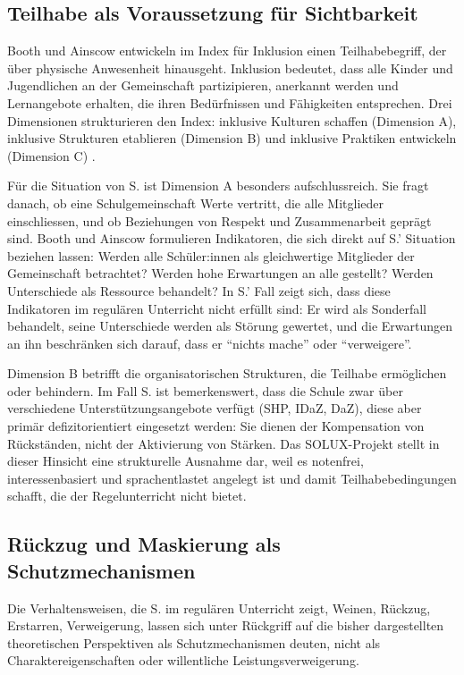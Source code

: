 \documentclass[ngerman, a4paper]{article}
\begin{document}
\subsection{Teilhabe als Voraussetzung für Sichtbarkeit}

Booth und Ainscow entwickeln im Index für Inklusion einen Teilhabebegriff, der über
physische Anwesenheit hinausgeht. Inklusion bedeutet, dass alle Kinder und Jugendlichen
an der Gemeinschaft partizipieren, anerkannt werden und Lernangebote erhalten, die
ihren Bedürfnissen und Fähigkeiten entsprechen. Drei Dimensionen strukturieren den
Index: inklusive Kulturen schaffen (Dimension A), inklusive Strukturen etablieren
(Dimension B) und inklusive Praktiken entwickeln (Dimension C)
\parencite{booth2019index}.

Für die Situation von S. ist Dimension A besonders aufschlussreich. Sie fragt danach,
ob eine Schulgemeinschaft Werte vertritt, die alle Mitglieder einschliessen, und ob
Beziehungen von Respekt und Zusammenarbeit geprägt sind. Booth und Ainscow
formulieren Indikatoren, die sich direkt auf S.' Situation beziehen lassen: Werden alle
Schüler:innen als gleichwertige Mitglieder der Gemeinschaft betrachtet? Werden hohe
Erwartungen an alle gestellt? Werden Unterschiede als Ressource behandelt? In S.' Fall
zeigt sich, dass diese Indikatoren im regulären Unterricht nicht erfüllt sind: Er wird
als Sonderfall behandelt, seine Unterschiede werden als Störung gewertet, und die
Erwartungen an ihn beschränken sich darauf, dass er \enquote{nichts mache} oder
\enquote{verweigere}.

Dimension B betrifft die organisatorischen Strukturen, die Teilhabe ermöglichen oder
behindern. Im Fall S. ist bemerkenswert, dass die Schule zwar über verschiedene
Unterstützungsangebote verfügt (SHP, IDaZ, DaZ), diese aber primär
defizitorientiert eingesetzt werden: Sie dienen der Kompensation von Rückständen,
nicht der Aktivierung von Stärken. Das SOLUX-Projekt stellt in dieser Hinsicht
eine strukturelle Ausnahme dar, weil es notenfrei, interessenbasiert und
sprachentlastet angelegt ist und damit Teilhabebedingungen schafft, die der
Regelunterricht nicht bietet.

\subsection{Rückzug und Maskierung als Schutzmechanismen}

Die Verhaltensweisen, die S. im regulären Unterricht zeigt, Weinen, Rückzug, Erstarren,
Verweigerung, lassen sich unter Rückgriff auf die bisher dargestellten theoretischen
Perspektiven als Schutzmechanismen deuten, nicht als Charaktereigenschaften oder
willentliche Leistungsverweigerung.
\end{document}
